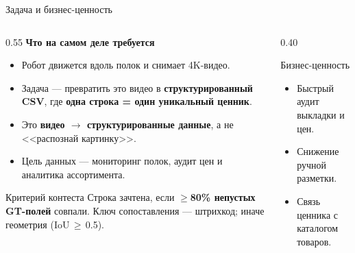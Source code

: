 \documentclass[aspectratio=169,10pt]{beamer}
\newcommand{\hl}[1]{{\bfseries\color{accent}#1}}
\newcommand{\smalltitle}[1]{{\small\bfseries\color{ink}#1}}
\begin{document}
\begin{frame}{Задача и бизнес-ценность}
  \begin{columns}[T,onlytextwidth]
    \begin{column}{0.55\textwidth}
      \smalltitle{Что на самом деле требуется}\vspace{0.35em}
      \begin{itemize}\setlength\itemsep{2pt}
        \item Робот движется вдоль полок и снимает 4K-видео.
        \item Задача — превратить это видео в \hl{структурированный CSV}, где \hl{одна строка = один уникальный ценник}.
        \item Это \hl{видео $\to$ структурированные данные}, а не <<распознай картинку>>.
        \item Цель данных — мониторинг полок, аудит цен и аналитика ассортимента.
      \end{itemize}
      \vspace{0.7em}
      \begin{block}{Критерий контеста}
        \footnotesize Строка зачтена, если \hl{$\geq$80\% непустых GT-полей} совпали.
        Ключ сопоставления — штрихкод; иначе геометрия (IoU\,$\geq$\,0.5).
      \end{block}
    \end{column}
    \begin{column}{0.40\textwidth}
      \vspace{0.4em}
      \vspace{0.55em}
      \begin{block}{Бизнес-ценность}
        \begin{itemize}\setlength\itemsep{1pt}
          \item Быстрый аудит выкладки и цен.
          \item Снижение ручной разметки.
          \item Связь ценника с каталогом товаров.
        \end{itemize}
      \end{block}
    \end{column}
  \end{columns}
\end{frame}
\end{document}
